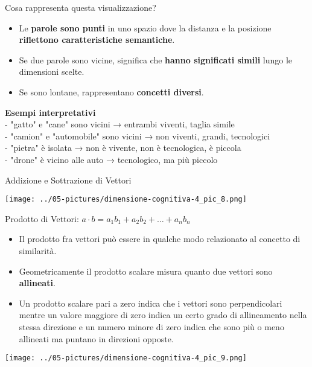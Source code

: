 \documentclass[aspectratio=169]{beamer}
\begin{document}
%
%
\begin{frame}{Cosa rappresenta questa visualizzazione?}
\begin{itemize}
\item Le \textbf{parole sono punti} in uno spazio dove la distanza e la posizione \textbf{riflettono caratteristiche semantiche}.
\item Se due parole sono vicine, significa che \textbf{hanno significati simili} lungo le dimensioni scelte.
\item Se sono lontane, rappresentano \textbf{concetti diversi}.
\end{itemize}
\vspace{0.3cm}
\textbf{Esempi interpretativi}\\
\vspace{0.3cm}
\small
- "gatto" e "cane" sono vicini → entrambi viventi, taglia simile\\
- "camion" e "automobile" sono vicini → non viventi, grandi, tecnologici\\
- "pietra" è isolata → non è vivente, non è tecnologica, è piccola\\
- "drone" è vicino alle auto → tecnologico, ma più piccolo

\end{frame}
%
%
\begin{frame}{Addizione e Sottrazione di Vettori}
\begin{center}
\texttt{[image: ../05-pictures/dimensione-cognitiva-4\_pic\_8.png]} 
\end{center}
\end{frame}
%
%
\begin{frame}{Prodotto di Vettori: $a \cdot b = a_1b_1+a_2b_2 + \dots +a_nb_n$}
\begin{itemize}
\item Il prodotto fra vettori può essere in qualche modo relazionato al concetto di similarità. 
\item Geometricamente il prodotto scalare misura quanto due vettori sono \textbf{allineati}. 
\item Un prodotto scalare pari a zero indica che i vettori sono perpendicolari mentre un valore maggiore di zero indica un certo grado di allineamento nella stessa direzione e un numero minore di zero indica che sono più o meno allineati ma puntano in direzioni opposte.
\end{itemize}
\begin{center}
\texttt{[image: ../05-pictures/dimensione-cognitiva-4\_pic\_9.png]} 
\end{center}
\end{frame}
%
\end{document}
